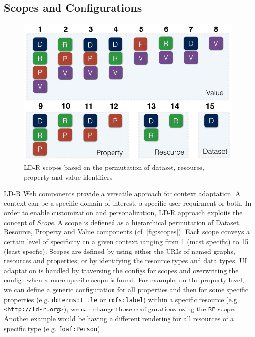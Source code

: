 \documentclass{acm_proc_article-sp}
\begin{document}

\subsection{Scopes and Configurations}

\begin{figure}[tb]
  \includegraphics[width=.9\linewidth]{images/scopes.jpg}
  \caption{LD-R scopes based on the permutation of dataset, resource, property and value identifiers.}
  \label{fig:scopes}
\end{figure}

LD-R Web components provide a versatile approach for context adaptation.
A context can be a specific domain of interest, a specific user requirment or both.
In order to enable customization and personalization, LD-R approach exploits the concept of \emph{Scope}.
A scope is defiened as a hierarchical permutation of Dataset, Resource, Property and Value components (cf. \autoref{fig:scopes}).
Each scope conveys a certain level of specificity on a given context ranging from 1 (most specific) to 15 (least specfic).
Scopes are defined by using either the URIs of named graphs, resources and properties; or by identifying the resource types and data types.
UI adaptation is handled by traversing the configs for scopes and overwriting the configs when a more specific scope is found.
For example, on the property level, we can define a generic configuration for all properties and then for some specific properties (e.g. \texttt{dcterms:title} or \texttt{rdfs:label}) within a specific resource (e.g. \texttt{<http://ld-r.org>}), we can change those configurations using the \texttt{RP} scope.
Another example would be having a different rendering for all resources of a specific type (e.g. \texttt{foaf:Person}).
\end{document}
